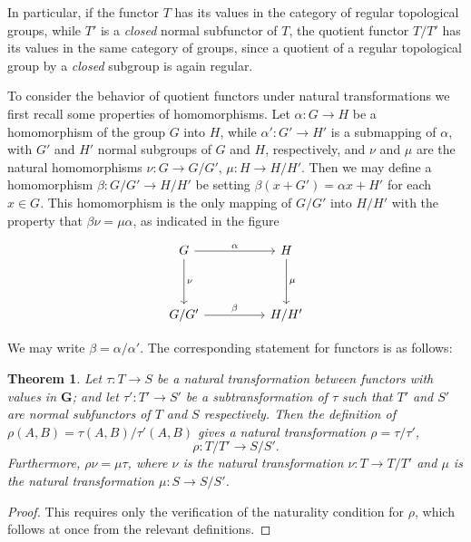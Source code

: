 \documentclass[11pt,a4paper]{report}
\newtheorem{theorem}{Theorem}
\begin{document}
In particular, if the functor $T$ has its values in the category of regular topological groups, while $T'$ is a 
\emph{closed} normal subfunctor of $T$, the quotient functor $T/T'$ has its values in the same category of groups,
since a quotient of a regular topological group by a \emph{closed} subgroup is again regular.

To consider the behavior of quotient functors under natural transformations we first recall some properties of
homomorphisms. Let $\alpha:G\rightarrow H$ be a homomorphism of the group $G$ into $H$, while $\alpha':G'\rightarrow H'$
is a submapping of $\alpha$, with $G'$ and $H'$ normal subgroups of $G$ and $H$, respectively, and $\nu$ and $\mu$ are
the natural homomorphisms $\nu:G\rightarrow G/G'$, $\mu:H\rightarrow H/H'$. Then we may define a homomorphism 
$\beta:G/G'\rightarrow H/H'$ be setting $\beta(x+G')=\alpha x + H'$ for each $x\in G$. This homomorphism is the only
mapping of $G/G'$ into $H/H'$ with the property that $\beta\nu=\mu\alpha$, as indicated in the figure
\begin{equation*}
	\begin{tikzpicture}
		\node (a) at (0,0)
		{ \begin{tikzcd}[sep=huge]
		G \arrow[r,"\alpha"] \arrow[d, "\nu"] & H\arrow[d,"\mu"]\\
		G/G' \arrow[r,"\beta"] & H/H'
		\end{tikzcd}};
	\end{tikzpicture}
\end{equation*}
We may write $\beta=\alpha/\alpha'$. The corresponding statement for functors is as follows:
\begin{theorem}\label{thm:grp_mod}
	Let $\tau:T\rightarrow S$ be a natural transformation between functors with values in $\mathbf{G}$;
	and let $\tau':T'\rightarrow S'$ be a subtransformation of $\tau$ such that $T'$ and $S'$ are normal
	subfunctors of $T$ and $S$ respectively. Then the definition of $\rho(A,B)=\tau(A,B)/\tau'(A,B)$
	gives a natural transformation $\rho=\tau/\tau'$,
	\begin{equation*}
		\rho:T/T'\rightarrow S/S'.
	\end{equation*}
	Furthermore, $\rho\nu=\mu\tau$, where $\nu$ is the natural transformation $\nu:T\rightarrow T/T'$ and
	$\mu$ is the natural transformation $\mu:S\rightarrow S/S'$.
\end{theorem}
\begin{proof}
	This requires only the verification of the naturality condition for $\rho$, which follows at once from
	the relevant definitions.
\end{proof}
\end{document}
